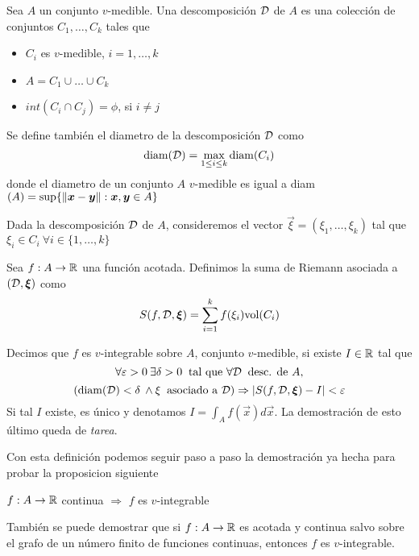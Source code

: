 \begin{definicion}
Sea $A$ un conjunto $v$-medible. Una descomposici\'on $\cal D$ {de} $A$ es una colecci\'on de conjuntos
$C_1,\ldots,C_k$ tales que
\begin{itemize}
\item $C_i$ es $v$-medible, $i=1,\ldots,k$
\item $A=C_1\cup\ldots\cup C_k$
\item $int(C_i\cap C_j)=\phi$, si $i\neq j$
\end{itemize}
Se define tambi\'en el diametro de la descomposici\'on $\cal D$
como
 \[{\rm diam}{(\cal D)}=\max_{1\leq i\leq k}{\rm diam} (C_i)\]
  donde
el diametro de un conjunto $A$ $v$-medible es igual a diam$
(A)=\sup\{\norm{\vec{x}-\vec{y}} : \vec{x},\vec{y}\in A\}$
\end{definicion}

Dada la descomposici\'on $\cal D$ de $A$, consideremos el vector
$\vec{\xi}=(\xi_1,\ldots,\xi_k)$ tal que $\xi_i\in C_i \:\forall i\in\{1,\ldots,k\}$

\begin{definicion}
Sea $f:A\to \R$ una funci\'on acotada. Definimos la suma de
Riemann asociada a $({\cal D},\vec{\xi})$ como
\[S(f,{\cal D},\vec{\xi})=\sum_{i=1}^k f(\xi_i){\rm vol}(C_i)\]
\end{definicion}

\begin{definicion} 
Decimos que $f$ es $v$-integrable sobre $A$, conjunto $v$-medible,  si existe
$I\in \R$ tal que
\[\forall \varepsilon>0\:\exists\delta>0\:\text{ tal que }\forall 
{\cal D}\:\text{ desc. de }A,
\]
\[ ({\rm diam}{(\cal D)}<\delta
\:\wedge \xi \:\text{ asociado a }{\cal D})\Rightarrow
|S(f,{\cal D},\vec{\xi})-I|<\varepsilon\] Si tal $I$ existe, es \'unico y denotamos $I=\int_Af(\vec{x})d\vec{x}$. La demostraci\'on de esto \'ultimo queda de \emph{tarea}.
\end{definicion}
Con esta definici\'on podemos seguir paso a paso la demostraci\'on
ya hecha para probar la proposicion siguiente

\begin{proposicion}
$f:A\to \R$ continua $\Rightarrow$ $f$ es $v$-integrable
\end{proposicion}

Tambi\'en se puede demostrar que si $f:A\to \R$ es acotada y
continua salvo sobre el grafo de un n\'umero finito de funciones
continuas, entonces $f$ es $v$-integrable.

